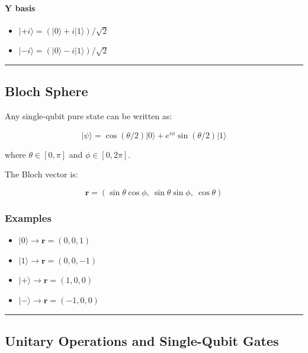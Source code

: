 \documentclass[
]{article}
\providecommand{\tightlist}{%
  \setlength{\itemsep}{0pt}\setlength{\parskip}{0pt}}
\begin{document}
\paragraph{Y basis}\label{y-basis}

\begin{itemize}
\tightlist
\item
  $|+i\rangle = (|0\rangle + i|1\rangle)/\sqrt{2}$
\item
  $|-i\rangle = (|0\rangle - i|1\rangle)/\sqrt{2}$
\end{itemize}

\begin{center}\rule{0.5\linewidth}{0.5pt}\end{center}

\subsection{Bloch Sphere}\label{bloch-sphere}

Any single-qubit pure state can be written as:

\[
|\psi\rangle = \cos(\theta/2)|0\rangle + e^{i\phi}\sin(\theta/2)|1\rangle
\]

where $\theta \in [0,\pi]$ and $\phi \in [0,2\pi]$.

The Bloch vector is:

\[
\mathbf{r} = (\sin\theta\cos\phi,\ \sin\theta\sin\phi,\ \cos\theta)
\]

\subsubsection{Examples}\label{examples-1}

\begin{itemize}
\tightlist
\item
  $|0\rangle \to \mathbf{r} = (0,0,1)$
\item
  $|1\rangle \to \mathbf{r} = (0,0,-1)$
\item
  $|+\rangle \to \mathbf{r} = (1,0,0)$
\item
  $|-\rangle \to \mathbf{r} = (-1,0,0)$
\end{itemize}

\begin{center}\rule{0.5\linewidth}{0.5pt}\end{center}

\subsection{Unitary Operations and Single-Qubit
Gates}\label{unitary-operations-and-single-qubit-gates}
\end{document}
